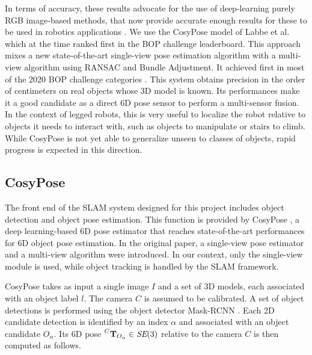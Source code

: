 In terms of accuracy, these results advocate for the use of deep-learning purely RGB image-based methods, that now provide accurate enough results 
for these to be used in robotics applications \cite{labbe2021single}. 
We use the CosyPose model of Labbe et al. \cite{labbe2020cosypose} which at the time ranked first in the BOP challenge leaderboard.
This approach mixes a new state-of-the-art single-view pose estimation algorithm with a multi-view algorithm using RANSAC and Bundle Adjustment. 
It achieved first in most of the 2020 BOP challenge categories \cite{hodan2020bop}. This system obtains precision in the order of centimeters 
on real objects whose 3D model is known. Its performances make it a good candidate as a direct 6D pose sensor to perform a multi-sensor fusion. 
In the context of legged robots, this is very useful to localize the robot relative to objects it needs to interact with, such as objects 
to manipulate or stairs to climb. While CosyPose is not yet able to generalize unseen to classes of objects, rapid progress is expected in 
this direction.

\subsection{CosyPose}
The front end of the SLAM system designed for this project includes object detection and object pose estimation. 
This function is provided by CosyPose \cite{labbe2020cosypose}, a deep learning-based 6D pose estimator that reaches state-of-the-art
 performances for 6D object pose estimation. %
In the original paper, a single-view pose estimator and a multi-view algorithm were introduced. In our context, only the single-view module is used, 
while object tracking is handled by the SLAM framework. 

CosyPose takes as input a single image $I$ and a set of 3D models, each associated with an object label $l$. The camera $C$ is assumed to be calibrated. 
A set of object detections is performed using the object detector Mask-RCNN \cite{he2018mask}. Each 2D candidate detection is identified 
by an index $\alpha$ and associated with an object candidate $O_{\alpha}$. Its 6D pose $\prescript{C}{}{{\bf T}}_{O_{\alpha}} \in \textit{SE} (3)$ relative to the camera $C$ 
is then computed as follows.

